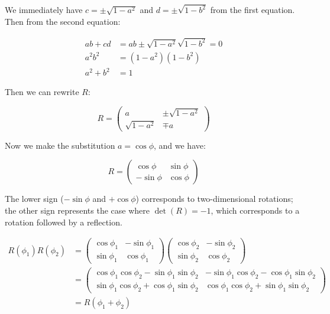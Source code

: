 \documentclass[12pt]{article}
\begin{document}
We immediately have $c = \pm \sqrt{1 - a^{2}}$ and $d = \pm \sqrt{1 - b^{2}}$ from the first equation. Then from the second equation:

\begin{equation}
    \begin{split}
        ab + cd &= ab \pm \sqrt{1 - a^{2}} \sqrt{1 - b^{2}} = 0 \\
        a^{2} b^{2} &= (1 - a^{2}) (1 - b^{2}) \\
        a^{2} + b^{2} &= 1
    \end{split}
\end{equation}

Then we can rewrite $R$:

\begin{equation}
    R = \begin{pmatrix}
        a                & \pm \sqrt{1 - a^{2}} \\
        \sqrt{1 - a^{2}} & \mp a
    \end{pmatrix}
\end{equation}

Now we make the substitution $a = \cos{\phi}$, and we have:

\begin{equation}
    R = \begin{pmatrix}
        \cos{\phi}  & \sin{\phi} \\
        -\sin{\phi} & \cos{\phi}
    \end{pmatrix}
\end{equation}

The lower sign ($-\sin{\phi}$ and $+\cos{\phi}$) corresponds to two-dimensional rotations; the other sign represents the case where $\det(R) = -1$, which corresponds to a rotation followed by a reflection.


\begin{equation}
    \begin{split}
        R(\phi_{1}) R(\phi_{2})
        &=
        \begin{pmatrix}
            \cos{\phi_{1}} & -\sin{\phi_{1}} \\
            \sin{\phi_{1}} & \cos{\phi_{1}}
        \end{pmatrix}
        \begin{pmatrix}
            \cos{\phi_{2}} & -\sin{\phi_{2}} \\
            \sin{\phi_{2}} & \cos{\phi_{2}}
        \end{pmatrix} \\
        &=
        \begin{pmatrix}
            \cos{\phi_{1}} \cos{\phi_{2}} - \sin{\phi_{1}} \sin{\phi_{2}} & -\sin{\phi_{1}} \cos{\phi_{2}} - \cos{\phi_{1}} \sin{\phi_{2}} \\
            \sin{\phi_{1}} \cos{\phi_{2}} + \cos{\phi_{1}} \sin{\phi_{2}} & \cos{\phi_{1}} \cos{\phi_{2}} + \sin{\phi_{1}} \sin{\phi_{2}}
        \end{pmatrix} \\
        &=
        R(\phi_{1} + \phi_{2})
    \end{split}
\end{equation}
\end{document}
